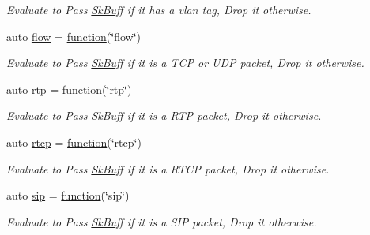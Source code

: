 \begin{DoxyCompactItemize}
\begin{DoxyCompactList}\small\item\em Evaluate to {\ttfamily Pass} \hyperlink{structpfq_1_1lang_1_1SkBuff}{Sk\+Buff} if it has a vlan tag, {\ttfamily Drop} it otherwise. \end{DoxyCompactList}\item 
auto \hyperlink{namespacepfq_1_1lang_1_1anonymous__namespace_02default_8hpp_03_af6c7518847c8c960b0e98cd856871a1b}{flow} = \hyperlink{namespacepfq_1_1lang_a1a4638059d700ae08d0ca63886ff2bb3}{function}(\char`\"{}flow\char`\"{})
\begin{DoxyCompactList}\small\item\em Evaluate to {\ttfamily Pass} \hyperlink{structpfq_1_1lang_1_1SkBuff}{Sk\+Buff} if it is a T\+CP or U\+DP packet, {\ttfamily Drop} it otherwise. \end{DoxyCompactList}\item 
auto \hyperlink{namespacepfq_1_1lang_1_1anonymous__namespace_02default_8hpp_03_aa8ac230fe8eeb0bccee8e31ba032cb8e}{rtp} = \hyperlink{namespacepfq_1_1lang_a1a4638059d700ae08d0ca63886ff2bb3}{function}(\char`\"{}rtp\char`\"{})
\begin{DoxyCompactList}\small\item\em Evaluate to {\ttfamily Pass} \hyperlink{structpfq_1_1lang_1_1SkBuff}{Sk\+Buff} if it is a R\+TP packet, {\ttfamily Drop} it otherwise. \end{DoxyCompactList}\item 
auto \hyperlink{namespacepfq_1_1lang_1_1anonymous__namespace_02default_8hpp_03_ad16ac0dfb9ae7abc1db76ab8041bada3}{rtcp} = \hyperlink{namespacepfq_1_1lang_a1a4638059d700ae08d0ca63886ff2bb3}{function}(\char`\"{}rtcp\char`\"{})
\begin{DoxyCompactList}\small\item\em Evaluate to {\ttfamily Pass} \hyperlink{structpfq_1_1lang_1_1SkBuff}{Sk\+Buff} if it is a R\+T\+CP packet, {\ttfamily Drop} it otherwise. \end{DoxyCompactList}\item 
auto \hyperlink{namespacepfq_1_1lang_1_1anonymous__namespace_02default_8hpp_03_a3ac0338626e771b43b200663e095aa36}{sip} = \hyperlink{namespacepfq_1_1lang_a1a4638059d700ae08d0ca63886ff2bb3}{function}(\char`\"{}sip\char`\"{})
\begin{DoxyCompactList}\small\item\em Evaluate to {\ttfamily Pass} \hyperlink{structpfq_1_1lang_1_1SkBuff}{Sk\+Buff} if it is a S\+IP packet, {\ttfamily Drop} it otherwise. \end{DoxyCompactList}\item 

\end{DoxyCompactItemize}
